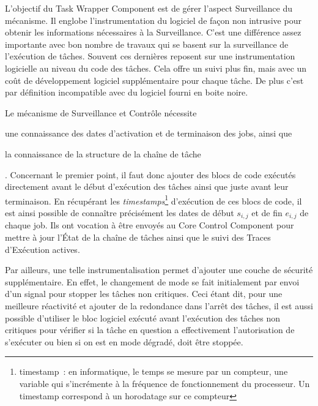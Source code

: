 \documentclass[french, a4paper, 11pt, twoside, pdftex]{StyleThese}
\begin{document}
        L'objectif du Task Wrapper Component est de gérer l'aspect Surveillance du mécanisme. Il englobe l'instrumentation du logiciel de façon non intrusive pour obtenir les informations nécessaires à la Surveillance. C'est une différence assez importante avec bon nombre de travaux qui se basent sur la surveillance de l'exécution de tâches. Souvent ces dernières reposent sur une instrumentation logicielle au niveau du code des tâches. Cela offre un suivi plus fin, mais avec un coût de développement logiciel supplémentaire pour chaque tâche. De plus c'est par définition incompatible avec du logiciel fourni en boite noire.
        
        Le mécanisme de Surveillance et Contrôle nécessite \begin{enumerate*}[label=\bfseries\alph*)]
        	\item une connaissance des dates d'activation et de terminaison des jobs, ainsi que 
        	\item la connaissance de la structure de la chaîne de tâche
        \end{enumerate*}. Concernant le premier point, il faut donc ajouter des blocs de code exécutés directement avant le début d'exécution des tâches ainsi que juste avant leur terminaison. En récupérant les \textit{timestamps}\footnote{timestamp~: en informatique, le temps se mesure par un compteur, une variable qui s'incrémente à la fréquence de fonctionnement du processeur. Un timestamp correspond à un horodatage sur ce compteur} d'exécution de ces blocs de code, il est ainsi possible de connaître précisément les dates de début $s_{i,j}$ et de fin $e_{i,j}$ de chaque job. Ils ont vocation à être envoyés au Core Control Component pour mettre à jour l'État de la chaîne de tâches ainsi que le suivi des Traces d'Exécution actives.
        
        Par ailleurs, une telle instrumentalisation permet d'ajouter une couche de sécurité supplémentaire. En effet, le changement de mode se fait initialement par envoi d'un signal pour stopper les tâches non critiques. Ceci étant dit, pour une meilleure réactivité et ajouter de la redondance dans l'arrêt des tâches, il est aussi possible d'utiliser le bloc logiciel exécuté avant l'exécution des tâches non critiques pour vérifier si la tâche en question a effectivement l'autorisation de s'exécuter ou bien si on est en mode dégradé, doit être stoppée. 
        
\end{document}
